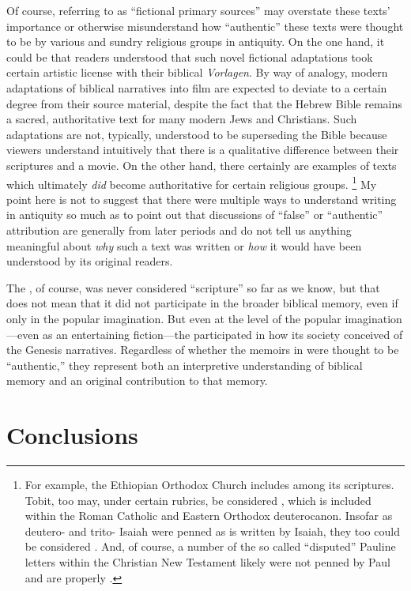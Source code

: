 Of course, referring to \psy as ``fictional primary sources'' may overstate these texts' importance or otherwise misunderstand how ``authentic'' these texts were thought to be by various and sundry religious groups in antiquity. On the one hand, it could be that readers understood that such novel fictional adaptations took certain artistic license with their biblical \emph{Vorlagen}. By way of analogy, modern adaptations of biblical narratives into film are expected to deviate to a certain degree from their source material, despite the fact that the Hebrew Bible remains a sacred, authoritative text for many modern Jews and Christians. Such adaptations are not, typically, understood to be superseding the Bible because viewers understand intuitively that there is a qualitative difference between their scriptures and a movie. On the other hand, there certainly are examples of \psgraphical texts which ultimately \emph{did} become authoritative for certain religious groups.%
%
\footnote{For example, the Ethiopian Orthodox Church includes \firstenoch among its scriptures. Tobit, too may, under certain rubrics, be considered \psa, which is included within the Roman Catholic and Eastern Orthodox deuterocanon. Insofar as deutero- and trito- Isaiah were penned as is written by Isaiah, they too could be considered \psa. And, of course, a number of the so called ``disputed'' Pauline letters within the Christian New Testament likely were not penned by Paul and are properly \psgraphical.}
%
My point here is not to suggest that there were multiple ways to understand \psgraphical writing in antiquity so much as to point out that discussions of ``false'' or ``authentic'' attribution are generally from later periods and do not tell us anything meaningful about \emph{why} such a text was written or \emph{how} it would have been understood by its original readers.

The \ga, of course, was never considered ``scripture'' so far as we know, but that does not mean that it did not participate in the broader biblical memory, even if only in the popular imagination. But even at the level of the popular imagination---even as an entertaining fiction---the \ga participated in how its society conceived of the Genesis narratives. Regardless of whether the memoirs in \ga were thought to be ``authentic,'' they represent both an interpretive understanding of biblical memory and an original contribution to that memory.\section{Conclusions}

